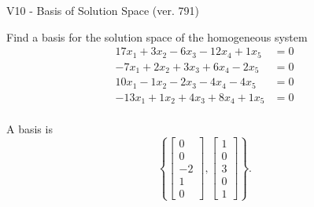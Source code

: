 \begin{exercise}
  \begin{exerciseTitle}V10 - Basis of Solution Space (ver. 791)\end{exerciseTitle}
  \begin{exerciseStatement}
    Find a basis for the solution space of the homogeneous system 
\begin{align*}
 17 x_ 1 + 3 x_ 2 -6 x_ 3 -12 x_ 4 + 1 x_ 5 &= 0  \\ 
  -7 x_ 1 + 2 x_ 2 + 3 x_ 3 + 6 x_ 4 -2 x_ 5 &= 0  \\ 
  10 x_ 1 -1 x_ 2 -2 x_ 3 -4 x_ 4 -4 x_ 5 &= 0  \\ 
  -13 x_ 1 + 1 x_ 2 + 4 x_ 3 + 8 x_ 4 + 1 x_ 5 &= 0  \\ 
 \end{align*}


 
  \end{exerciseStatement}

  \begin{exerciseAnswer}
   A basis is   
\[\left\{\left[\begin{array}{c}
0 \\
0 \\
-2 \\
1 \\
0
\end{array}\right] , \left[\begin{array}{c}
1 \\
0 \\
3 \\
0 \\
1
\end{array}\right]\right\}.\]

  


  \end{exerciseAnswer}
\end{exercise}